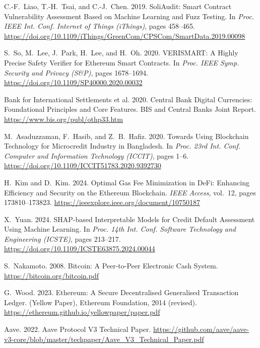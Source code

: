 \documentclass[12pt,a4paper]{report}
\begin{document}
{\begin{enumerate}[label={[\arabic*]}]
\item C.-F.~Liao, T.-H.~Tsai, and C.-J.~Chen. 2019. SoliAudit: Smart Contract Vulnerability Assessment Based on Machine Learning and Fuzz Testing. In \emph{Proc. IEEE Int. Conf. Internet of Things (iThings)}, pages 458--465. \url{https://doi.org/10.1109/iThings/GreenCom/CPSCom/SmartData.2019.00098}

\item S.~So, M.~Lee, J.~Park, H.~Lee, and H.~Oh. 2020. VERISMART: A Highly Precise Safety Verifier for Ethereum Smart Contracts. In \emph{Proc. IEEE Symp. Security and Privacy (S\&P)}, pages 1678--1694. \url{https://doi.org/10.1109/SP40000.2020.00032}

\item Bank for International Settlements et al. 2020. Central Bank Digital Currencies: Foundational Principles and Core Features. BIS and Central Banks Joint Report. \url{https://www.bis.org/publ/othp33.htm}

\item M.~Asaduzzaman, F.~Hasib, and Z.~B.~Hafiz. 2020. Towards Using Blockchain Technology for Microcredit Industry in Bangladesh. In \emph{Proc. 23rd Int. Conf. Computer and Information Technology (ICCIT)}, pages 1--6. \url{https://doi.org/10.1109/ICCIT51783.2020.9392730}

\item H.~Kim and D.~Kim. 2024. Optimal Gas Fee Minimization in DeFi: Enhancing Efficiency and Security on the Ethereum Blockchain. \emph{IEEE Access}, vol.~12, pages 173810--173823. \url{https://ieeexplore.ieee.org/document/10750187}

\item X.~Yuan. 2024. SHAP-based Interpretable Models for Credit Default Assessment Using Machine Learning. In \emph{Proc. 14th Int. Conf. Software Technology and Engineering (ICSTE)}, pages 213--217. \url{https://doi.org/10.1109/ICSTE63875.2024.00044}

\item S.~Nakamoto. 2008. Bitcoin: A Peer-to-Peer Electronic Cash System. \url{https://bitcoin.org/bitcoin.pdf}

\item G.~Wood. 2023. Ethereum: A Secure Decentralised Generalised Transaction Ledger. (Yellow Paper), Ethereum Foundation, 2014 (revised). \url{https://ethereum.github.io/yellowpaper/paper.pdf}

\item Aave. 2022. Aave Protocol V3 Technical Paper. \url{https://github.com/aave/aave-v3-core/blob/master/techpaper/Aave_V3_Technical_Paper.pdf}


\end{enumerate}}
\end{document}
